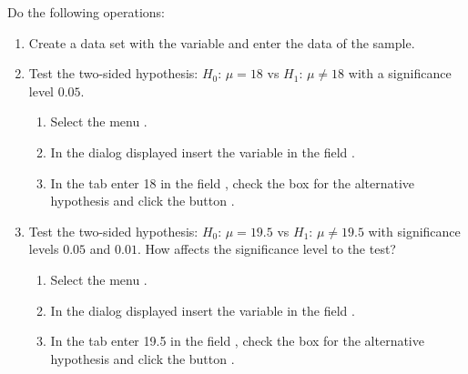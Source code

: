 \begin{enumerate}[leftmargin=*]
Do the following operations:
\begin{enumerate}
\item Create a data set with the variable  and enter the data of the sample.

\item Test the two-sided hypothesis: $H_0$: $\mu=18$ vs $H_1$: $\mu\neq18$ with a significance level $0.05$.
\begin{indication}
\begin{enumerate}
\item Select the menu .
\item In the dialog displayed insert the variable  in the field .
\item In the  tab enter 18 in the field , check the box 
for the alternative hypothesis and click the button .
\end{enumerate}
\end{indication}

\item Test the two-sided hypothesis: $H_0$: $\mu=19.5$ vs $H_1$: $\mu\neq19.5$ with significance levels $0.05$ and
$0.01$.
How affects the significance level to the test?

\begin{indication}
\begin{enumerate}
\item Select the menu .
\item In the dialog displayed insert the variable  in the field .
\item In the  tab enter 19.5 in the field , check the box 
for the alternative hypothesis and click the button .
\end{enumerate}
\end{indication}


\end{enumerate}
\end{enumerate}

